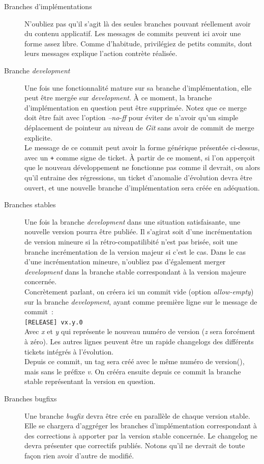 \begin{description}
	\item[Branches d'implémentations]
		N'oubliez pas qu'il s'agit là des seules branches pouvant réellement avoir du contenu applicatif.
		Les messages de commits peuvent ici avoir une forme assez libre.
		Comme d'habitude, privilégiez de petits commits, dont leurs messages explique l'action contrète réalisée.
	\item[Branche \emph{development}]
		Une fois une fonctionnalité mature sur sa branche d'implémentation, elle peut être mergée sur \emph{development}.
		À ce moment, la branche d'implémentation en question peut être supprimée.
		Notez que ce merge doit être fait avec l'option \emph{--no-ff} pour éviter de n'avoir qu'un simple déplacement de pointeur au niveau de \emph{Git} sans avoir de commit de merge explicite.\\

		Le message de ce commit peut avoir la forme générique présentée ci-dessus, avec un {\tt+} comme signe de ticket.
		À partir de ce moment, si l'on apperçoit que le nouveau développement ne fonctionne pas comme il devrait, ou alors qu'il entraine des régressions, un ticket d'anomalie d'évolution devra être ouvert, et une nouvelle branche d'implémentation sera créée en adéquation.
	\item[Branches stables]
		Une fois la branche \emph{development} dans une situation satisfaisante, une nouvelle version pourra être publiée.
		Il s'agirat soit d'une incrémentation de version mineure si la rétro-compatilibité n'est pas brisée, soit une branche incrémentation de la version majeur si c'est le cas.
		Dans le cas d'une incrémentation mineure, n'oubliez pas d'également merger \emph{development} dans la branche stable correspondant à la version majeure concernée.\\

		Concrètement parlant, on créera ici un commit vide (option \emph{allow-empty}) sur la branche \emph{development}, ayant comme première ligne sur le message de commit~:\\
		{\tt[RELEASE] vx.y.0}\\
		Avec \emph{x} et \emph{y} qui représente le nouveau numéro de version (\emph{z} sera forcément à zéro).
		Les autres lignes peuvent être un rapide changelogs des différents tickets intégrés à l'évolution.\\

		Depuis ce commit, un tag sera créé avec le même numéro de version(), mais sans le préfixe \emph{v}.
		On crééra ensuite depuis ce commit la branche stable représentant la version en question.
	\item[Branches bugfixs]
		Une branche \emph{bugfix} devra être crée en parallèle de chaque version stable.
		Elle se chargera d'aggréger les branches d'implémentation correspondant à des corrections à apporter par la version stable concernée.
		Le changelog ne devra présenter que correctifs publiés.
		Notons qu'il ne devrait de toute façon rien avoir d'autre de modifié.\\


\end{description}
